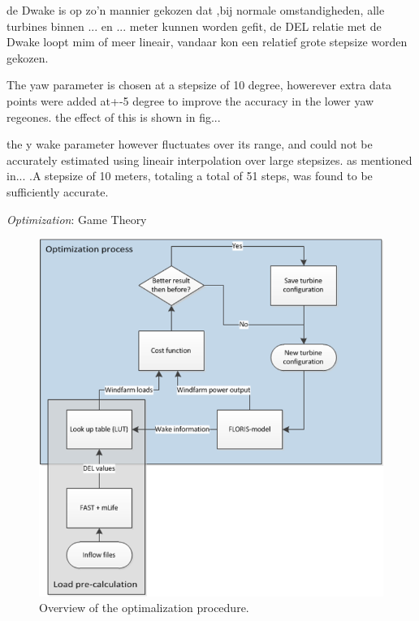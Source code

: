 de Dwake is op zo'n mannier gekozen dat ,bij normale omstandigheden, alle turbines binnen ... en ... meter kunnen worden gefit, de DEL relatie met de Dwake loopt mim of meer lineair, vandaar kon een relatief grote stepsize worden gekozen.

The yaw parameter is chosen at a stepsize of 10 degree, howerever extra data points were added at+-5 degree to improve the accuracy in the lower yaw regeones. the effect of this is shown in fig... 

the y wake parameter however fluctuates over its range, and could not be accurately estimated using lineair interpolation over large stepsizes. as mentioned in... .A stepsize of 10 meters, totaling a total of 51 steps, was found to be sufficiently accurate. 

 
 

\textit{Optimization}: Game Theory
\begin{figure}
  \includegraphics[width=\linewidth]{./Figures/OptimizationProcess.png}
  \caption{Overview of the optimalization procedure.}
  \label{fig:optim}
\end{figure}

